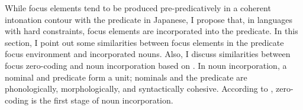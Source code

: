 While focus elements tend to be produced pre-predicatively in a coherent intonation contour with the predicate in Japanese,
I propose that, in languages with hard constraints,
focus elements are incorporated into the predicate.
In this section,
I point out some similarities between focus elements in the predicate focus environment and incorporated nouns.
Also, I discuss similarities between focus zero-coding and noun incorporation based on .
In noun incorporation,
a nominal and predicate form a unit;
nominals and the predicate are phonologically, morphologically, and syntactically {cohesive}.
According to ,
zero-coding is the first stage of noun incorporation.

